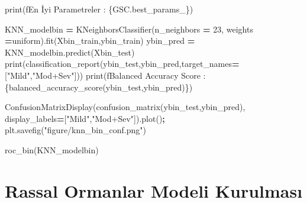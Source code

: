 \documentclass[12pt,twoside]{deuthesis}
\newenvironment{Shaded}{\begin{snugshade}}{\end{snugshade}}
\newcommand{\BuiltInTok}[1]{#1}
\newcommand{\DecValTok}[1]{\textcolor[rgb]{0.00,0.00,0.81}{#1}}
\newcommand{\NormalTok}[1]{#1}
\newcommand{\OperatorTok}[1]{\textcolor[rgb]{0.81,0.36,0.00}{\textbf{#1}}}
\newcommand{\SpecialCharTok}[1]{\textcolor[rgb]{0.00,0.00,0.00}{#1}}
\newcommand{\SpecialStringTok}[1]{\textcolor[rgb]{0.31,0.60,0.02}{#1}}
\newcommand{\StringTok}[1]{\textcolor[rgb]{0.31,0.60,0.02}{#1}}
\begin{document}
\begin{Shaded}
\begin{Highlighting}[]
\BuiltInTok{print}\NormalTok{(}\SpecialStringTok{f\textquotesingle{}En İyi Parametreler : }\SpecialCharTok{\{}\NormalTok{GSC}\SpecialCharTok{.}\NormalTok{best\_params\_}\SpecialCharTok{\}}\SpecialStringTok{\textquotesingle{}}\NormalTok{)}
\end{Highlighting}
\end{Shaded}
\begin{Shaded}
\begin{Highlighting}[]
\NormalTok{KNN\_modelbin }\OperatorTok{=}\NormalTok{ KNeighborsClassifier(n\_neighbors }\OperatorTok{=} \DecValTok{23}\NormalTok{,}
\NormalTok{                                 weights }\OperatorTok{=}\StringTok{\textquotesingle{}uniform\textquotesingle{}}\NormalTok{).fit(Xbin\_train,ybin\_train)}
\NormalTok{ybin\_pred }\OperatorTok{=}\NormalTok{ KNN\_modelbin.predict(Xbin\_test)}
\BuiltInTok{print}\NormalTok{(classification\_report(ybin\_test,ybin\_pred,target\_names}\OperatorTok{=}\NormalTok{[}\StringTok{"Mild"}\NormalTok{,}\StringTok{"Mod+Sev"}\NormalTok{]))}
\BuiltInTok{print}\NormalTok{(}\SpecialStringTok{f\textquotesingle{}Balanced Accuracy Score : }\SpecialCharTok{\{}\NormalTok{balanced\_accuracy\_score(ybin\_test,ybin\_pred)}\SpecialCharTok{\}}\SpecialStringTok{\textquotesingle{}}\NormalTok{)}
\end{Highlighting}
\end{Shaded}
\begin{Shaded}
\begin{Highlighting}[]
\NormalTok{ConfusionMatrixDisplay(confusion\_matrix(ybin\_test,ybin\_pred),}
\NormalTok{                       display\_labels}\OperatorTok{=}\NormalTok{[}\StringTok{"Mild"}\NormalTok{,}\StringTok{"Mod+Sev"}\NormalTok{]).plot()}\OperatorTok{;}
\NormalTok{plt.savefig(}\StringTok{"figure/knn\_bin\_conf.png"}\NormalTok{)}
\end{Highlighting}
\end{Shaded}
\begin{Shaded}
\begin{Highlighting}[]
\NormalTok{roc\_bin(KNN\_modelbin)}
\end{Highlighting}
\end{Shaded}
\normalsize

\hypertarget{rassal-ormanlar-modeli-kurulmasux131-1}{%
\section{Rassal Ormanlar Modeli Kurulması}\label{rassal-ormanlar-modeli-kurulmasux131-1}}
\end{document}
